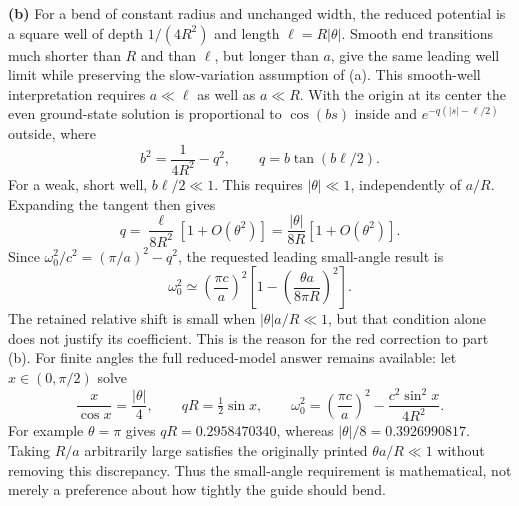 \medskip\noindent\textbf{(b)} For a bend of constant radius and unchanged width, the reduced
potential is a square well of depth $1/(4R^2)$ and length
$\ell=R|\theta|$.  Smooth end transitions much shorter than $R$
and than $\ell$, but longer than $a$, give the same leading well
limit while preserving the slow-variation assumption of (a).
This smooth-well interpretation requires $a\ll\ell$ as well as
$a\ll R$. With the
origin at its center the even ground-state solution is proportional
to $\cos(bs)$ inside and $e^{-q(|s|-\ell/2)}$ outside, where
\[
b^2=\frac1{4R^2}-q^2,\qquad
\boxed{q=b\tan(b\ell/2).}
\]
For a weak, short well, $b\ell/2\ll1$.  This requires
$|\theta|\ll1$, independently of $a/R$.  Expanding the tangent
then gives
\[
q=\frac{\ell}{8R^2}[1+O(\theta^2)]
=\frac{|\theta|}{8R}[1+O(\theta^2)].
\]
Since $\omega_0^2/c^2=(\pi/a)^2-q^2$, the requested leading
small-angle result is
\[
\boxed{\omega_0^2\simeq\left(\frac{\pi c}{a}\right)^2
 \left[1-\left(\frac{\theta a}{8\pi R}\right)^2\right].}
\]
The retained relative shift is small when $|\theta|a/R\ll1$,
but that condition alone does not justify its coefficient.
This is the reason for the red correction to part (b).
For finite angles the full reduced-model answer remains available:
let $x\in(0,\pi/2)$ solve
\[
\frac{x}{\cos x}=\frac{|\theta|}{4},\qquad
qR=\tfrac12\sin x,\qquad
\omega_0^2=\left(\frac{\pi c}{a}\right)^2-
 \frac{c^2\sin^2x}{4R^2}.
\]
For example $\theta=\pi$ gives $qR=0.2958470340$, whereas
$|\theta|/8=0.3926990817$.  Taking $R/a$ arbitrarily large
satisfies the originally printed $\theta a/R\ll1$ without
removing this discrepancy.  Thus the small-angle requirement is
mathematical, not merely a preference about how tightly the guide
should bend.

